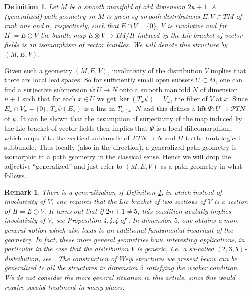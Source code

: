 \documentclass[11pt]{amsart}
\newtheorem{definition}[proposition]{Definition}
\newtheorem{remark}[proposition]{Remark}
\numberwithin{proposition}{section}
\numberwithin{equation}{section}
\begin{document}
\begin{definition}\label{def2.1} 
Let $M$ be a smooth manifold of odd dimension $2n+1$. A (generalized) path geometry on $M$ is given by smooth distributions $E,V\subset TM$ of rank one and $n$, respectively, such that $E\cap V=\{0\}$, $V$ is involutive and for $H:=E\oplus V$ the bundle map $E\otimes V\to TM/H$ induced by the Lie bracket of vector fields is an isomorphism of vector bundles. We will denote this structure by $(M,E,V)$. 
\end{definition}

Given such a geometry $(M,E,V)$, involutivity of the distribution $V$ implies that there are local leaf spaces. So for sufficiently small open subsets $U\subset M$, one can find a surjective submersion $\psi:U\to N$ onto a smooth manifold $N$ of dimension $n+1$ such that for each $x\in U$ we get $\ker(T_x\psi)=V_x$, the fiber of $V$ at $x$. Since $E_x\cap V_x=\{0\}$, $T_x\psi(E_x)$ is a line in $T_{\psi(x)}N$ and this defines a lift $\Psi:U\to \mathcal PTN$ of $\psi$. It can be shown that the assumption of surjectivity of the map induced by the Lie bracket of vector fields then implies that $\Psi$ is a local diffeomorphism, which maps $V$ to the vertical subbundle of $\mathcal PTN\to N$ and $H$ to the tautological subbundle. Thus locally (also in the direction), a generalized path geometry is isomorphic to a path geometry in the classical sense. Hence we will drop the adjective ``generalized'' and just refer to $(M,E,V)$ as a path geometry in what follows.   

\begin{remark}\label{rem2.1}
There is a generalization of Definition \ref{def2.1}, in which instead of involutivity of $V$, one requires that the Lie bracket of two sections of $V$ is a section of $H=E\oplus V$. It turns out that if $2n+1\neq 5$, this condition acutally implies involutivity of $V$, see Proposition 4.4.4 of \cite{Book}. In dimension $5$, one obtains a more general notion which also leads to an additional fundamental invariant of the geometry. In fact, these more general geometries have interesting applications, in particular in the case that the distribution $V$ is generic, i.e.\ a so-called $(2,3,5)$-distribution, see \cite{An-Nurowski}. The construction of Weyl structures we present below can be generalized to all the structures in dimension $5$ satisfying the weaker condition.  We do not consider the more general situation in this article, since this would require special treatment in many places. 
\end{remark}
\end{document}
